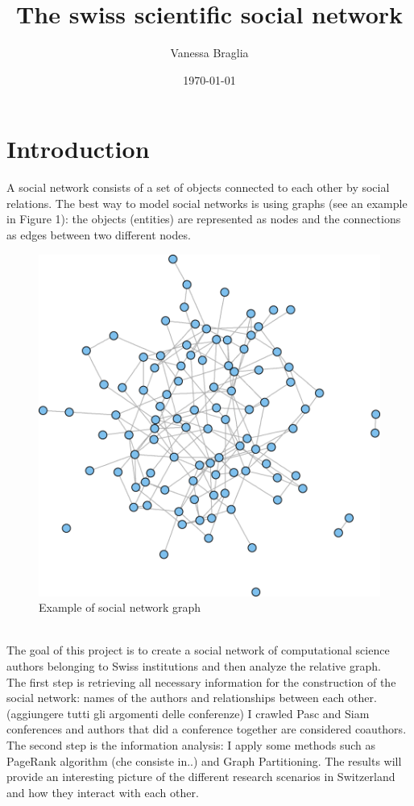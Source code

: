 \documentclass[12 pt]{article}
\author{Vanessa Braglia}
\title{The swiss scientific social network}
\date{\today}
\begin{document}
\selectfont
\maketitle 
\newpage
\tableofcontents
\newpage
\section{Introduction}
A social network consists of a set of objects connected to each other by social relations. The best way to model social networks is using graphs (see an example in Figure 1): the objects (entities) are represented as nodes and the connections as edges between two different nodes. \\
\begin{figure} [h!]
\centering 
\includegraphics[scale=0.5]{graph.png}
\caption{Example of social network graph}
\end{figure}
\\
The goal of this project is to create a social network of computational science authors belonging to Swiss institutions and then analyze the relative graph.\\
The first step is retrieving all necessary information for the construction of the social network: names of the authors and relationships between each other. (aggiungere tutti gli argomenti delle conferenze) I crawled Pasc and Siam conferences and authors that did a conference together are considered coauthors.\\
The second step is the information analysis: I apply some methods such as PageRank algorithm (che consiste in..) and Graph Partitioning.
The results will provide an interesting picture of the different research scenarios in Switzerland and how they interact with each other.
\end{document}
